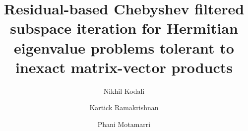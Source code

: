 \documentclass[preprint,3p,number,sort&compress]{elsarticle}
\begin{document}
\begin{frontmatter}



\title{Residual-based Chebyshev filtered subspace iteration for Hermitian eigenvalue problems tolerant to inexact matrix-vector products} 


\author[inst1]{Nikhil Kodali}
\author[inst1]{Kartick Ramakrishnan}
\author[inst1]{Phani Motamarri}


\end{frontmatter}
\end{document}
